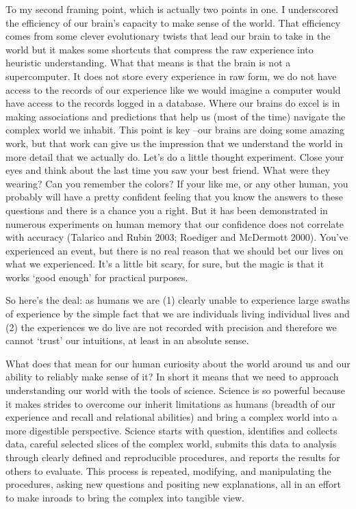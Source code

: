 \documentclass[
  letterpaper,
]{latex/krantz}
\begin{document}
To my second framing point, which is actually two points in one. I
underscored the efficiency of our brain's capacity to make sense of the
world. That efficiency comes from some clever evolutionary twists that
lead our brain to take in the world but it makes some shortcuts that
compress the raw experience into heuristic understanding. What that
means is that the brain is not a supercomputer. It does not store every
experience in raw form, we do not have access to the records of our
experience like we would imagine a computer would have access to the
records logged in a database. Where our brains do excel is in making
associations and predictions that help us (most of the time) navigate
the complex world we inhabit. This point is key --our brains are doing
some amazing work, but that work can give us the impression that we
understand the world in more detail that we actually do. Let's do a
little thought experiment. Close your eyes and think about the last time
you saw your best friend. What were they wearing? Can you remember the
colors? If your like me, or any other human, you probably will have a
pretty confident feeling that you know the answers to these questions
and there is a chance you a right. But it has been demonstrated in
numerous experiments on human memory that our confidence does not
correlate with accuracy (Talarico and Rubin 2003; Roediger and McDermott
2000). You've experienced an event, but there is no real reason that we
should bet our lives on what we experienced. It's a little bit scary,
for sure, but the magic is that it works `good enough' for practical
purposes.

So here's the deal: as humans we are (1) clearly unable to experience
large swaths of experience by the simple fact that we are individuals
living individual lives and (2) the experiences we do live are not
recorded with precision and therefore we cannot `trust' our intuitions,
at least in an absolute sense.

What does that mean for our human curiosity about the world around us
and our ability to reliably make sense of it? In short it means that we
need to approach understanding our world with the tools of science.
Science is so powerful because it makes strides to overcome our inherit
limitations as humans (breadth of our experience and recall and
relational abilities) and bring a complex world into a more digestible
perspective. Science starts with question, identifies and collects data,
careful selected slices of the complex world, submits this data to
analysis through clearly defined and reproducible procedures, and
reports the results for others to evaluate. This process is repeated,
modifying, and manipulating the procedures, asking new questions and
positing new explanations, all in an effort to make inroads to bring the
complex into tangible view.
\end{document}
